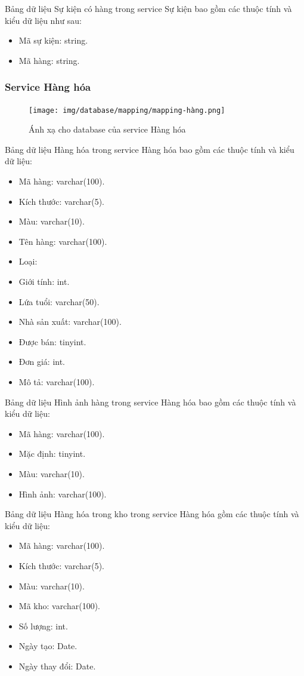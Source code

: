 Bảng dữ liệu Sự kiện có hàng trong service Sự kiện bao gồm các thuộc tính và kiểu dữ liệu như sau:
\begin{itemize}
	\item Mã sự kiện: string.
	\item Mã hàng: string.
\end{itemize}

\subsubsection{Service Hàng hóa}
\begin{figure}[!htp]
	\begin{center}
		\texttt{[image: img/database/mapping/mapping-hàng.png]}
		\newline
		\caption{Ánh xạ cho database của service Hàng hóa}
	\end{center}
\end{figure}

Bảng dữ liệu Hàng hóa trong service Hàng hóa bao gồm các thuộc tính và kiểu dữ liệu:
\begin{itemize}
	\item Mã hàng: varchar(100).
	\item Kích thước: varchar(5).
	\item Màu: varchar(10).
	\item Tên hàng: varchar(100).
	\item Loại: 
	\item Giới tính: int.
	\item Lứa tuổi: varchar(50).
	\item Nhà sản xuất: varchar(100).
	\item Được bán: tinyint.
	\item Đơn giá: int.
	\item Mô tả: varchar(100).
\end{itemize}

Bảng dữ liệu Hình ảnh hàng trong service Hàng hóa bao gồm các thuộc tính và kiểu dữ liệu:
\begin{itemize}
	\item Mã hàng: varchar(100).
	\item Mặc định: tinyint.
	\item Màu: varchar(10).
	\item Hình ảnh: varchar(100).
\end{itemize}

Bảng dữ liệu Hàng hóa trong kho trong service Hàng hóa gồm các thuộc tính và kiểu dữ liệu:
\begin{itemize}
	\item Mã hàng: varchar(100).
	\item Kích thước: varchar(5).
	\item Màu: varchar(10).
	\item Mã kho: varchar(100).
	\item Số lượng: int.
	\item Ngày tạo: Date.
	\item Ngày thay đổi: Date.
\end{itemize}

